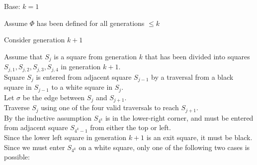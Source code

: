 \documentclass[letterpaper,12pt,fleqn]{article}
\begin{document}
\begin{theproof}[by Induction on $k$]
\listbreak
\begin{description}

\item{Base:} $k=1$


\item{Assume $\Phi$ has been defined for all generations $\le k$}

\item{Consider generation $k+1$}

Assume that $S_j$ is a square from generation $k$ that has been divided into
squares $S_{j,1}, S_{j,2}, S_{j,3}, S_{j,4}$ in generation $k+1$. \\
Square $S_j$ is entered from adjacent square $S_{j-1}$ by a traversal from a
black square in $S_{j-1}$ to a white square in $S_j$. \\
Let $\sigma$ be the edge between $S_j$ and $S_{j+1}$. \\
Traverse $S_j$ using one of the four valid traversals to reach $S_{j+1}$. \\
By the inductive assumption $S_{4^k}$ is in the lower-right corner, and must be
entered from adjacent square $S_{4^k-1}$ from either the top or left. \\
Since the lower left square in generation $k+1$ is an exit square, it must be
black. Since we must enter $S_{4^k}$ on a white square, only one of the
following two cases is possible:

\newpage


\vspace{0.5in}


\end{description}
\end{theproof}
\end{document}
